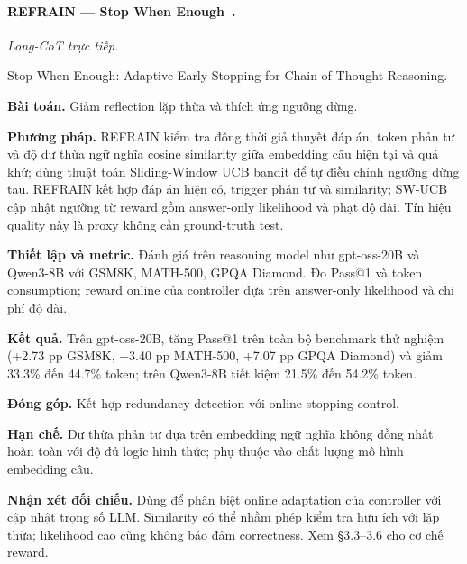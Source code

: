 \begin{samepage}
\paragraph{REFRAIN — Stop When Enough~\cite{rra2_refrain}.}
\emph{Long-CoT trực tiếp.}\par
{\raggedright\noindent\small Stop When Enough: Adaptive Early-Stopping for Chain-of-Thought Reasoning.\par}
\noindent\textbf{Bài toán.} Giảm reflection lặp thừa và thích ứng ngưỡng dừng.\par
\end{samepage}
\noindent\textbf{Phương pháp.} REFRAIN kiểm tra đồng thời giả thuyết đáp án, token phản tư và độ dư thừa ngữ nghĩa cosine similarity giữa embedding câu hiện tại và quá khứ; dùng thuật toán Sliding-Window UCB bandit để tự điều chỉnh ngưỡng dừng tau. REFRAIN kết hợp đáp án hiện có, trigger phản tư và similarity; SW-UCB cập nhật ngưỡng từ reward gồm answer-only likelihood và phạt độ dài. Tín hiệu quality này là proxy không cần ground-truth test.\par
\noindent\textbf{Thiết lập và metric.} Đánh giá trên reasoning model như gpt-oss-20B và Qwen3-8B với GSM8K, MATH-500, GPQA Diamond. Đo Pass@1 và token consumption; reward online của controller dựa trên answer-only likelihood và chi phí độ dài.\par
\noindent\textbf{Kết quả.} Trên gpt-oss-20B, tăng Pass@1 trên toàn bộ benchmark thử nghiệm (+2.73 pp GSM8K, +3.40 pp MATH-500, +7.07 pp GPQA Diamond) và giảm 33.3\% đến 44.7\% token; trên Qwen3-8B tiết kiệm 21.5\% đến 54.2\% token.\par
\noindent\textbf{Đóng góp.} Kết hợp redundancy detection với online stopping control.\par
\noindent\textbf{Hạn chế.} Dư thừa phản tư dựa trên embedding ngữ nghĩa không đồng nhất hoàn toàn với độ đủ logic hình thức; phụ thuộc vào chất lượng mô hình embedding câu.\par
\begin{samepage}
\noindent\textbf{Nhận xét đối chiếu.} Dùng để phân biệt online adaptation của controller với cập nhật trọng số LLM. Similarity có thể nhầm phép kiểm tra hữu ích với lặp thừa; likelihood cao cũng không bảo đảm correctness. Xem §3.3–3.6 cho cơ chế reward.\par
{}
\end{samepage}

